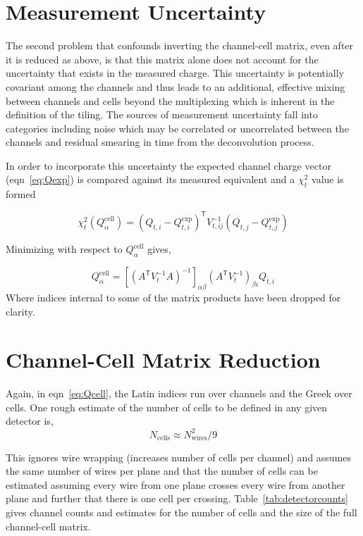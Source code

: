 \documentclass[letter]{article}
\def\mQdec{Q_{t,i}}
\def\mQexp{Q^{\mathrm{exp}}_{t,i}}
\def\mVcov{V_{t,ij}}
\def\mQcell{Q^{\mathrm{cell}}_\alpha}
\def\Qcell{$\mQcell$\xspace}
\begin{document}
\section{Measurement Uncertainty}
\label{sec:chargeunc}

The second problem that confounds inverting the channel-cell matrix,
even after it is reduced as above, is that this matrix alone does not
account for the uncertainty that exists in the measured charge.
This uncertainty is potentially covariant among the channels and thus
leads to an additional, effective mixing between channels and cells
beyond the multiplexing which is inherent in the definition of the
tiling.
The sources of measurement uncertainty fall into categories including
noise which may be correlated or uncorrelated between the channels and
residual smearing in time from the deconvolution process.

In order to incorporate this uncertainty the expected channel charge
vector (eqn~\ref{eq:Qexp}) is compared against its measured equivalent and 
a $\chi^2_t$ value is formed

\begin{equation}
  \label{eq:chi2}
  \chi^2_t(\mQcell) = (\mQdec - \mQexp)^\mathsf{T}\mVcov^{-1}(Q_{t,j} - Q^{\mathrm{exp}}_{t,j})
\end{equation}

\noindent Minimizing with respect to \Qcell gives,

\begin{equation}
  \label{eq:Qcell}
  \mQcell = [(A^\mathsf{T}V_t^{-1}A)^{-1}]_{\alpha\beta}
  (A^\mathsf{T}V_t^{-1})_{\beta i}\mQdec
\end{equation}
Where indices internal to some of the matrix products have been
dropped for clarity.

\section{Channel-Cell Matrix Reduction}
\label{sec:reduction}

Again, in eqn~\ref{eq:Qcell}, the Latin indices run over
channels and the Greek over cells.
One rough estimate of the number of cells to be defined in any given
detector is,
\begin{equation}
  \label{eq:ncellsestimate}
  N_\mathrm{cells} \approx N_\mathrm{wires}^2/9
\end{equation}

This ignores wire wrapping (increases number of cells per channel) and
assumes the same number of wires per plane and that the number of
cells can be estimated assuming every wire from one plane crosses
every wire from another plane and further that there is one cell per
crossing.
Table~\ref{tab:detectorcounts} gives channel counts and estimates for the
number of cells and the size of the full channel-cell matrix.
\end{document}
